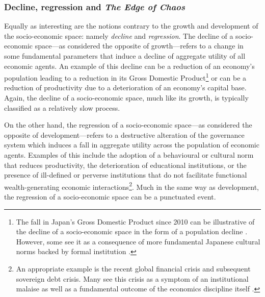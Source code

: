\subsubsection{Decline, regression and \emph{The Edge of Chaos}}

Equally as interesting are the notions contrary to the growth and development of the socio-economic space: namely \emph{decline} and \emph{regression}. The decline of a socio-economic space---as considered the opposite of growth---refers to a change in some fundamental parameters that induce a decline of aggregate utility of all economic agents. An example of this decline can be a reduction of an economy's population leading to a reduction in its Gross Domestic Product\footnote{The fall in Japan's Gross Domestic Product since 2010 can be illustrative of the decline of a socio-economic space in the form of a population decline \citep{Economist2014}. However, some see it as a consequence of more fundamental Japanese cultural norms backed by formal institution \citep{West2011}.} or can be a reduction of productivity due to a deterioration of an economy's capital base. Again, the decline of a socio-economic space, much like its growth, is typically classified as a relatively slow process.

On the other hand, the regression of a socio-economic space---as considered the opposite of development---refers to a destructive alteration of the governance system which induces a fall in aggregate utility across the population of economic agents. Examples of this include the adoption of a behavioural or cultural norm that reduces productivity, the deterioration of educational institutions, or the presence of ill-defined or perverse institutions that do not facilitate functional wealth-generating economic interactions\footnote{An appropriate example is the recent global financial crisis and subsequent sovereign debt crisis. Many see this crisis as a symptom of an institutional malaise \citep{Crotty2009, Ferguson2014} as well as a fundamental outcome of the economics discipline itself \citep{Hodgson2008, Hodgson2009, Krugman2009}.}. Much in the same way as development, the regression of a socio-economic space can be a punctuated event.

